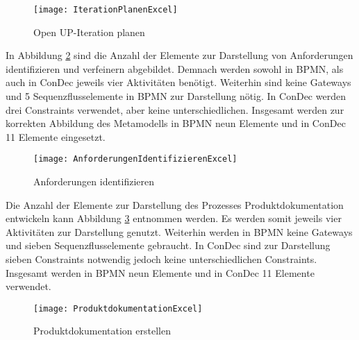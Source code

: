 \begin{figure}[htp]
\begin{center}
  \texttt{[image: IterationPlanenExcel]} %
  \caption{Open UP-Iteration planen}
  \label{fig:IterationPlanenExcel}
\end{center}
\end{figure}

In Abbildung \ref{fig:AnforderungenIdentifizierenExcel} sind die Anzahl der Elemente zur Darstellung von Anforderungen identifizieren und verfeinern abgebildet. Demnach werden sowohl in BPMN, als auch in ConDec jeweils vier Aktivitäten benötigt. Weiterhin sind keine Gateways und 5 Sequenzflusselemente in BPMN zur Darstellung nötig. In ConDec werden drei Constraints verwendet, aber keine unterschiedlichen. Insgesamt werden zur korrekten Abbildung des Metamodells in BPMN neun Elemente und in ConDec 11 Elemente eingesetzt.\newline

\begin{figure}[htp]
\begin{center}
  \texttt{[image: AnforderungenIdentifizierenExcel]} %
  \caption{Anforderungen identifizieren}
  \label{fig:AnforderungenIdentifizierenExcel}
\end{center}
\end{figure}

Die Anzahl der Elemente zur Darstellung des Prozesses Produktdokumentation entwickeln kann Abbildung \ref{fig:ProduktdokumentationExcel} entnommen werden. Es werden somit jeweils vier Aktivitäten zur Darstellung genutzt. Weiterhin werden in BPMN keine Gateways und sieben Sequenzflusselemente gebraucht. In ConDec sind zur Darstellung sieben Constraints notwendig jedoch keine unterschiedlichen Constraints. Insgesamt werden in BPMN neun Elemente und in ConDec 11 Elemente verwendet.\newline

\begin{figure}[htp]
\begin{center}
  \texttt{[image: ProduktdokumentationExcel]} %
  \caption{Produktdokumentation erstellen}
  \label{fig:ProduktdokumentationExcel}
\end{center}
\end{figure}

